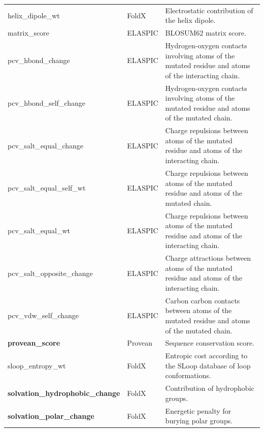 \begin{table}[tb]
\begin{tabular}{ l | l | p{7cm} }
		helix\_dipole\_wt                         & FoldX          & Electrostatic contribution of the helix dipole.                                                     \\
		matrix\_score                             & ELASPIC        & BLOSUM62 matrix score.                                                                              \\
		pcv\_hbond\_change                        & ELASPIC        & Hydrogen-oxygen contacts involving atoms of the mutated residue and atoms of the interacting chain. \\
		pcv\_hbond\_self\_change                  & ELASPIC        & Hydrogen-oxygen contacts involving atoms of the mutated residue and atoms of the mutated chain.     \\
		pcv\_salt\_equal\_change                  & ELASPIC        & Charge repulsions between atoms of the mutated residue and atoms of the interacting chain.          \\
		pcv\_salt\_equal\_self\_wt                & ELASPIC        & Charge repulsions between atoms of the mutated residue and atoms of the mutated chain.              \\
		pcv\_salt\_equal\_wt                      & ELASPIC        & Charge repulsions between atoms of the mutated residue and atoms of the interacting chain.          \\
		pcv\_salt\_opposite\_change               & ELASPIC        & Charge attractions between atoms of the mutated residue and atoms of the interacting chain.         \\
		pcv\_vdw\_self\_change                    & ELASPIC        & Carbon carbon contacts between atoms of the mutated residue and atoms of the mutated chain.         \\
		\textbf{provean\_score}                   & Provean        & Sequence conservation score.                                                                        \\
		sloop\_entropy\_wt                        & FoldX          & Entropic cost according to the SLoop database of loop conformations.                                \\
		\textbf{solvation\_hydrophobic\_change}   & FoldX          & Contribution of hydrophobic groups.                                                                 \\
		\textbf{solvation\_polar\_change}         & FoldX          & Energetic penalty for burying polar groups.                                                         \\

\end{tabular}
\end{table}
